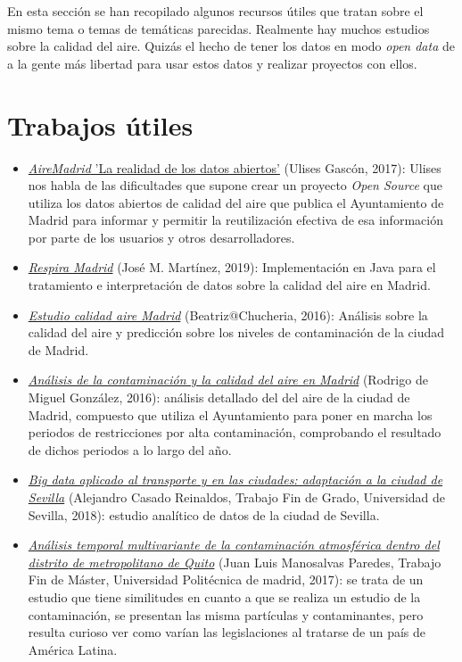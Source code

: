 
En esta sección se han recopilado algunos recursos  útiles que tratan sobre el mismo tema o temas de temáticas parecidas. Realmente hay muchos estudios sobre la calidad del aire. Quizás el hecho de tener los datos en modo \textit{open data} de a la gente más libertad para usar estos datos y realizar proyectos con ellos.

\section{Trabajos útiles}

\begin{itemize}
	\item \href{https://github.com/UlisesGascon/Charla-AireMadrid-los-datos-abiertos}{\textit{AireMadrid} 'La realidad de los datos abiertos'} (Ulises Gascón, 2017): Ulises nos habla de las dificultades que supone crear un proyecto \textit{Open Source} que utiliza los datos abiertos de calidad del aire que publica el Ayuntamiento de Madrid para informar y permitir la reutilización efectiva de esa información por parte de los usuarios y otros desarrolladores.
	\item \href{https://github.com/Toolson12/poisonMAD}{\textit{Respira Madrid}} (José M. Martínez, 2019): Implementación en Java para el tratamiento e interpretación de datos sobre la calidad del aire en Madrid.
	\item \href{https://github.com/chucheria/CalidadAire}{\textit{Estudio calidad aire Madrid}} (Beatriz@Chucheria, 2016): Análisis sobre la calidad del aire y predicción sobre los niveles de contaminación de la ciudad de Madrid.
	\item \href{https://www.rodrigodemiguel.es/AnalisisAireMadrid/}{\textit{Análisis de la contaminación y la calidad del aire en Madrid}} (Rodrigo de Miguel González, 2016): análisis detallado del  del aire de la ciudad de Madrid, compuesto que utiliza el Ayuntamiento para poner en marcha los periodos de restricciones por alta contaminación, comprobando el resultado de dichos periodos a lo largo del año.
	\item \href{https://idus.us.es/xmlui/handle/11441/79499}{\textit{Big data aplicado al transporte y en las ciudades: adaptación a la ciudad de Sevilla}} (Alejandro Casado Reinaldos, Trabajo Fin de Grado, Universidad de Sevilla, 2018): estudio analítico de datos de la ciudad de Sevilla. 
	\item \href{http://oa.upm.es/47313/}{\textit{Análisis temporal multivariante de la contaminación atmosférica dentro del distrito de metropolitano de Quito}} (Juan Luis Manosalvas Paredes, Trabajo Fin de Máster, Universidad Politécnica de madrid, 2017): se trata de un estudio que tiene  similitudes en cuanto a que se realiza un estudio de la contaminación, se presentan las misma partículas y contaminantes, pero resulta curioso ver como varían las legislaciones al tratarse de un país de América Latina.

\end{itemize}
